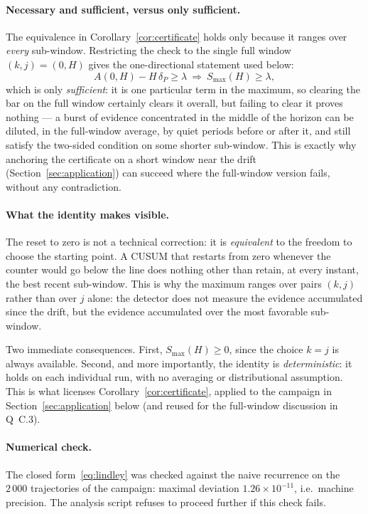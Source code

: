 \documentclass[10pt,a4paper]{article}
\begin{document}
\paragraph{Necessary and sufficient, versus only sufficient.} The equivalence in
Corollary~\ref{cor:certificate} holds only because it ranges over \emph{every}
sub-window. Restricting the check to the single full window $(k,j) = (0,H)$ gives the
one-directional statement used below:
\[
  A(0,H) - H\,\delta_P \ge \lambda \ \Longrightarrow\ S_{\max}(H) \ge \lambda,
\]
which is only \emph{sufficient}: it is one particular term in the maximum, so clearing
the bar on the full window certainly clears it overall, but failing to clear it proves
nothing --- a burst of evidence concentrated in the middle of the horizon can be diluted,
in the full-window average, by quiet periods before or after it, and still satisfy the
two-sided condition on some shorter sub-window. This is exactly why anchoring the
certificate on a short window near the drift (Section~\ref{sec:application}) can succeed
where the full-window version fails, without any contradiction.

\paragraph{What the identity makes visible.} The reset to zero is not a technical
correction: it is \emph{equivalent} to the freedom to choose the starting point. A
CUSUM that restarts from zero whenever the counter would go below the line does
nothing other than retain, at every instant, the best recent sub-window. This is why
the maximum ranges over pairs $(k,j)$ rather than over $j$ alone: the detector does
not measure the evidence accumulated since the drift, but the evidence accumulated
over the most favorable sub-window.

Two immediate consequences. First, $S_{\max}(H) \ge 0$, since the choice $k=j$ is
always available. Second, and more importantly, the identity is \emph{deterministic}:
it holds on each individual run, with no averaging or distributional assumption. This
is what licenses Corollary~\ref{cor:certificate}, applied to the campaign in
Section~\ref{sec:application} below (and reused for the full-window discussion in
Q~C.3).

\paragraph{Numerical check.} The closed form~\eqref{eq:lindley} was checked against the
naive recurrence on the $2\,000$ trajectories of the campaign: maximal deviation
$1.26 \times 10^{-11}$, i.e.\ machine precision. The analysis script refuses to proceed
further if this check fails.
\end{document}
